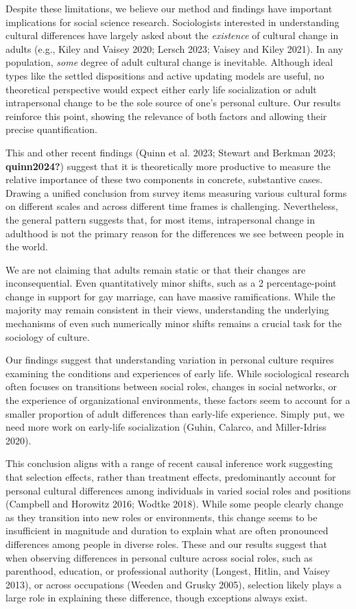\documentclass[
  12pt,
]{article}
\begin{document}
Despite these limitations, we believe our method and findings have
important implications for social science research. Sociologists
interested in understanding cultural differences have largely asked
about the \emph{existence} of cultural change in adults (e.g., Kiley and
Vaisey 2020; Lersch 2023; Vaisey and Kiley 2021). In any population,
\emph{some} degree of adult cultural change is inevitable. Although
ideal types like the settled dispositions and active updating models are
useful, no theoretical perspective would expect either early life
socialization or adult intrapersonal change to be the sole source of
one's personal culture. Our results reinforce this point, showing the
relevance of both factors and allowing their precise quantification.

This and other recent findings (Quinn et al. 2023; Stewart and Berkman
2023; \textbf{quinn2024?}) suggest that it is theoretically more
productive to measure the relative importance of these two components in
concrete, substantive cases. Drawing a unified conclusion from survey
items measuring various cultural forms on different scales and across
different time frames is challenging. Nevertheless, the general pattern
suggests that, for most items, intrapersonal change in adulthood is not
the primary reason for the differences we see between people in the
world.

We are not claiming that adults remain static or that their changes are
inconsequential. Even quantitatively minor shifts, such as a 2
percentage-point change in support for gay marriage, can have massive
ramifications. While the majority may remain consistent in their views,
understanding the underlying mechanisms of even such numerically minor
shifts remains a crucial task for the sociology of culture.

Our findings suggest that understanding variation in personal culture
requires examining the conditions and experiences of early life. While
sociological research often focuses on transitions between social roles,
changes in social networks, or the experience of organizational
environments, these factors seem to account for a smaller proportion of
adult differences than early-life experience. Simply put, we need more
work on early-life socialization (Guhin, Calarco, and Miller-Idriss
2020).

This conclusion aligns with a range of recent causal inference work
suggesting that selection effects, rather than treatment effects,
predominantly account for personal cultural differences among
individuals in varied social roles and positions (Campbell and Horowitz
2016; Wodtke 2018). While some people clearly change as they transition
into new roles or environments, this change seems to be insufficient in
magnitude and duration to explain what are often pronounced differences
among people in diverse roles. These and our results suggest that when
observing differences in personal culture across social roles, such as
parenthood, education, or professional authority (Longest, Hitlin, and
Vaisey 2013), or across occupations (Weeden and Grusky 2005), selection
likely plays a large role in explaining these difference, though
exceptions always exist.
\end{document}
